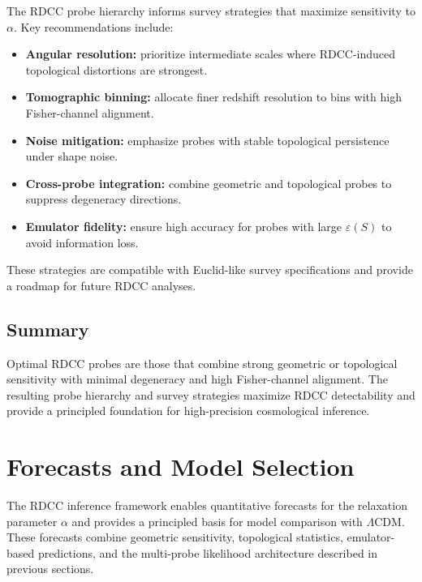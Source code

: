 \documentclass[11pt,a4paper]{article}
\begin{document}
The RDCC probe hierarchy informs survey strategies that maximize sensitivity to
$\alpha$. Key recommendations include:

\begin{itemize}
    \item \textbf{Angular resolution:}  
    prioritize intermediate scales where RDCC-induced topological distortions are
    strongest.

    \item \textbf{Tomographic binning:}  
    allocate finer redshift resolution to bins with high Fisher-channel
    alignment.

    \item \textbf{Noise mitigation:}  
    emphasize probes with stable topological persistence under shape noise.

    \item \textbf{Cross-probe integration:}  
    combine geometric and topological probes to suppress degeneracy directions.

    \item \textbf{Emulator fidelity:}  
    ensure high accuracy for probes with large $\varepsilon(S)$ to avoid
    information loss.
\end{itemize}

These strategies are compatible with Euclid-like survey specifications and
provide a roadmap for future RDCC analyses.

\subsection{Summary}

Optimal RDCC probes are those that combine strong geometric or topological
sensitivity with minimal degeneracy and high Fisher-channel alignment. The
resulting probe hierarchy and survey strategies maximize RDCC detectability and
provide a principled foundation for high-precision cosmological inference.


\section{Forecasts and Model Selection}

The RDCC inference framework enables quantitative forecasts for the relaxation
parameter $\alpha$ and provides a principled basis for model comparison with
$\Lambda$CDM. These forecasts combine geometric sensitivity, topological
statistics, emulator-based predictions, and the multi-probe likelihood
architecture described in previous sections.
\end{document}

